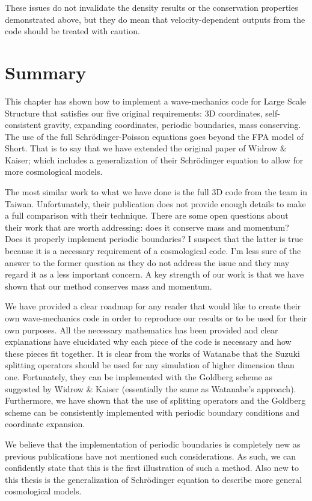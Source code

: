 \noindent These issues do not invalidate the density results or the conservation properties demonstrated above, but they do mean that velocity-dependent outputs from the code should be treated with caution.

\section{Summary}
This chapter has shown how to implement a wave-mechanics code for Large Scale Structure that satisfies our five original requirements: 3D coordinates, self-consistent gravity, expanding coordinates, periodic boundaries, mass conserving. The use of the full Schr\"odinger-Poisson equations goes beyond the FPA model of Short. That is to say that we have extended the original paper of Widrow \& Kaiser; which includes a generalization of their Schr\"odinger equation to allow for more cosmological models.

The most similar work to what we have done is the full 3D code from the team in Taiwan. Unfortunately, their publication does not provide enough details to make a full comparison with their technique. There are some open questions about their work that are worth addressing: does it conserve mass and momentum? Does it properly implement periodic boundaries? I suspect that the latter is true because it is a necessary requirement of a cosmological code. I'm less sure of the answer to the former question as they do not address the issue and they may regard it as a less important concern. A key strength of our work is that we have shown that our method conserves mass and momentum.

We have provided a clear roadmap for any reader that would like to create their own wave-mechanics code in order to reproduce our results or to be used for their own purposes. All the necessary mathematics has been provided and clear explanations have elucidated why each piece of the code is necessary and how these pieces fit together. It is clear from the works of Watanabe that the Suzuki splitting operators should be used for any simulation of higher dimension than one. Fortunately, they can be implemented with the Goldberg scheme as suggested by Widrow \& Kaiser (essentially the same as Watanabe's approach). Furthermore, we have shown that the use of splitting operators and the Goldberg scheme can be consistently implemented with periodic boundary conditions and coordinate expansion.

We believe that the implementation of periodic boundaries is completely new as previous publications have not mentioned such considerations. As such, we can confidently state that this is the first illustration of such a method. Also new to this thesis is the generalization of Schr\"odinger equation to describe more general cosmological models.


